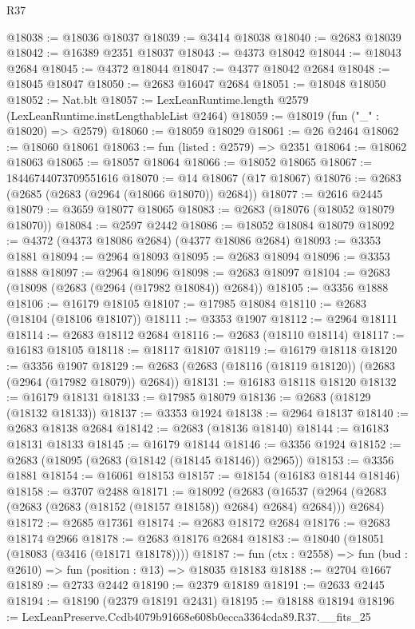 \begin{lexlean}{R37}
\begin{coremodule}
@18038 := @18036 @18037
@18039 := @3414 @18038
@18040 := @2683 @18039
@18042 := @16389 @2351 @18037
@18043 := @4373 @18042
@18044 := @18043 @2684
@18045 := @4372 @18044
@18047 := @4377 @18042 @2684
@18048 := @18045 @18047
@18050 := @2683 @16047 @2684
@18051 := @18048 @18050
@18052 := Nat.blt
@18057 := LexLeanRuntime.length @2579 (LexLeanRuntime.instLengthableList @2464)
@18059 := @18019 (fun ("_" : @18020) => @2579)
@18060 := @18059 @18029
@18061 := @26 @2464
@18062 := @18060 @18061
@18063 := fun (listed : @2579) => @2351
@18064 := @18062 @18063
@18065 := @18057 @18064
@18066 := @18052 @18065
@18067 := 18446744073709551616
@18070 := @14 @18067 (@17 @18067)
@18076 := @2683 (@2685 (@2683 (@2964 (@18066 @18070)) @2684))
@18077 := @2616 @2445
@18079 := @3659 @18077 @18065
@18083 := @2683 (@18076 (@18052 @18079 @18070))
@18084 := @2597 @2442
@18086 := @18052 @18084 @18079
@18092 := @4372 (@4373 @18086 @2684) (@4377 @18086 @2684)
@18093 := @3353 @1881
@18094 := @2964 @18093
@18095 := @2683 @18094
@18096 := @3353 @1888
@18097 := @2964 @18096
@18098 := @2683 @18097
@18104 := @2683 (@18098 (@2683 (@2964 (@17982 @18084)) @2684))
@18105 := @3356 @1888
@18106 := @16179 @18105
@18107 := @17985 @18084
@18110 := @2683 (@18104 (@18106 @18107))
@18111 := @3353 @1907
@18112 := @2964 @18111
@18114 := @2683 @18112 @2684
@18116 := @2683 (@18110 @18114)
@18117 := @16183 @18105
@18118 := @18117 @18107
@18119 := @16179 @18118
@18120 := @3356 @1907
@18129 := @2683 (@2683 (@18116 (@18119 @18120)) (@2683 (@2964 (@17982 @18079)) @2684))
@18131 := @16183 @18118 @18120
@18132 := @16179 @18131
@18133 := @17985 @18079
@18136 := @2683 (@18129 (@18132 @18133))
@18137 := @3353 @1924
@18138 := @2964 @18137
@18140 := @2683 @18138 @2684
@18142 := @2683 (@18136 @18140)
@18144 := @16183 @18131 @18133
@18145 := @16179 @18144
@18146 := @3356 @1924
@18152 := @2683 (@18095 (@2683 (@18142 (@18145 @18146)) @2965))
@18153 := @3356 @1881
@18154 := @16061 @18153
@18157 := @18154 (@16183 @18144 @18146)
@18158 := @3707 @2488
@18171 := @18092
    (@2683
      (@16537 (@2964 (@2683 (@2683 (@2683 (@18152 (@18157 @18158)) @2684) @2684) @2684)))
      @2684)
@18172 := @2685 @17361
@18174 := @2683 @18172 @2684
@18176 := @2683 @18174 @2966
@18178 := @2683 @18176 @2684
@18183 := @18040 (@18051 (@18083 (@3416 (@18171 @18178))))
@18187 := fun (ctx : @2558) => fun (bud : @2610) => fun (position : @13) => @18035 @18183
@18188 := @2704 @1667
@18189 := @2733 @2442
@18190 := @2379 @18189
@18191 := @2633 @2445
@18194 := @18190 (@2379 @18191 @2431)
@18195 := @18188 @18194
@18196 := LexLeanPreserve.Ccdb4079b91668e608b0ecca3364cda89.R37.__fits_25

\end{coremodule}
\end{lexlean}
